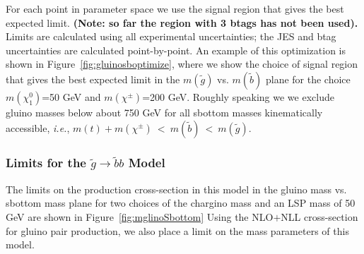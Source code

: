 For each point in parameter space we use the signal region that gives
the best expected limit.  
{\bf (Note: so far the region with 3 btags has not been used).}
Limits are calculated using all experimental
uncertainties; the JES and btag uncertainties are calculated point-by-point.
An example of this optimization is shown in Figure~\ref{fig:gluinosboptimize},
where we show the choice of signal region that gives the best expected limit
in the $m(\widetilde{g})$ vs. $m(\widetilde{b})$ plane for the choice
$m(\chi^0_1)$=50 GeV and $m(\chi^{\pm})$=200 GeV. 
Roughly speaking we we exclude gluino masses below about 750 GeV for 
all sbottom masses kinematically accessible, {\it i.e.}, 
$m(t)+m(\chi^{\pm})~<~m(\widetilde{b})~<~m(\widetilde{g})$.



\subsubsection{Limits for the $\widetilde{g} \to \widetilde{b}b$ Model}
\label{sec:gbblimits}

The limits on the production cross-section in this model in the 
gluino mass vs. sbottom mass plane for two choices of the 
chargino mass and an LSP mass of 50 GeV 
are shown in Figure~\ref{fig:mglinoSbottom}
Using the 
NLO$+$NLL cross-section for gluino pair production, we also place a limit
on the mass parameters of this model.


